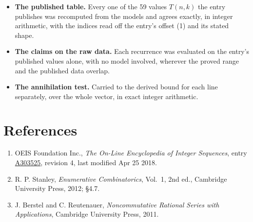 \documentclass[11pt]{article}
\theoremstyle{definition}
\begin{document}
\begin{itemize}

\item {\bfseries The published table.} Every one of the 59 values $T(n,k)$ the entry publishes was recomputed from the models and agrees exactly, in integer arithmetic, with the indices read off the entry's offset (1) and its stated shape.

\item {\bfseries The claims on the raw data.} Each recurrence was evaluated on the entry's published values alone, with no model involved, wherever the proved range and the published data overlap.

\item {\bfseries The annihilation test.} Carried to the derived bound for each line separately, over the whole vector, in exact integer arithmetic.

\end{itemize}

\section{References}

\begin{enumerate}

\item OEIS Foundation Inc., \emph{The On-Line Encyclopedia of Integer Sequences}, entry \href{https://oeis.org/A303525}{A303525}, revision 4, last modified Apr 25 2018.

\item R. P. Stanley, \emph{Enumerative Combinatorics}, Vol.~1, 2nd ed., Cambridge University Press, 2012; \S4.7.

\item J. Berstel and C. Reutenauer, \emph{Noncommutative Rational Series with Applications}, Cambridge University Press, 2011.

\end{enumerate}
\end{document}
